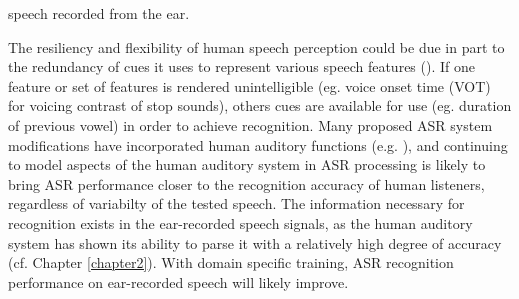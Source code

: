 \DIFaddend speech recorded from the ear\DIFdelbegin {}\DIFdelend \DIFaddbegin {}\DIFaddend .

The resiliency and flexibility of human speech perception could be due in part to the redundancy of cues it uses to represent various speech features (\cite{winter:14}).  If one feature or set of features is rendered unintelligible (eg. voice onset time (VOT) for voicing contrast of stop sounds), others cues are available for use (eg. duration of previous vowel) in order to achieve recognition.  Many proposed ASR system modifications have incorporated human auditory functions (e.g. \cite{kim:99,fazel:12,moritz:15}), and continuing to model aspects of the human auditory system in ASR processing is likely to bring ASR performance closer to the recognition accuracy of human listeners, regardless of variabilty of the tested speech.  The information necessary for recognition exists in the ear-recorded speech signals, as the human auditory system has shown its ability to parse it with a relatively high degree of accuracy (cf. Chapter \ref{chapter2}).  With domain specific training, ASR recognition performance on ear-recorded speech will likely improve.

